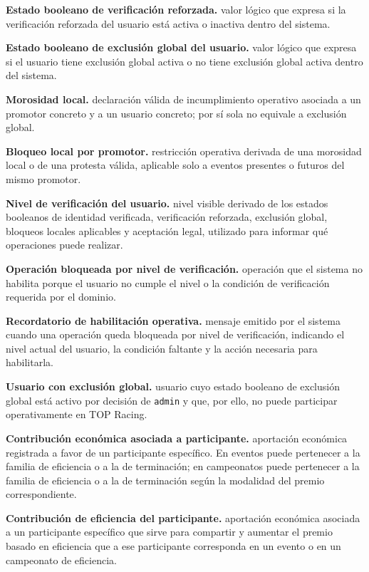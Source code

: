 \documentclass[10pt,letterpaper]{article}
\begin{document}
\noindent\textbf{Estado booleano de verificación reforzada.} valor lógico que expresa si la verificación reforzada del usuario está activa o inactiva dentro del sistema.\par
\noindent\textbf{Estado booleano de exclusión global del usuario.} valor lógico que expresa si el usuario tiene exclusión global activa o no tiene exclusión global activa dentro del sistema.\par
\noindent\textbf{Morosidad local.} declaración válida de incumplimiento operativo asociada a un promotor concreto y a un usuario concreto; por sí sola no equivale a exclusión global.\par
\noindent\textbf{Bloqueo local por promotor.} restricción operativa derivada de una morosidad local o de una protesta válida, aplicable solo a eventos presentes o futuros del mismo promotor.\par
\noindent\textbf{Nivel de verificación del usuario.} nivel visible derivado de los estados booleanos de identidad verificada, verificación reforzada, exclusión global, bloqueos locales aplicables y aceptación legal, utilizado para informar qué operaciones puede realizar.\par
\noindent\textbf{Operación bloqueada por nivel de verificación.} operación que el sistema no habilita porque el usuario no cumple el nivel o la condición de verificación requerida por el dominio.\par
\noindent\textbf{Recordatorio de habilitación operativa.} mensaje emitido por el sistema cuando una operación queda bloqueada por nivel de verificación, indicando el nivel actual del usuario, la condición faltante y la acción necesaria para habilitarla.\par
\noindent\textbf{Usuario con exclusión global.} usuario cuyo estado booleano de exclusión global está activo por decisión de \texttt{admin} y que, por ello, no puede participar operativamente en TOP Racing.\par
\noindent\textbf{Contribución económica asociada a participante.} aportación económica registrada a favor de un participante específico. En eventos puede pertenecer a la familia de eficiencia o a la de terminación; en campeonatos puede pertenecer a la familia de eficiencia o a la de terminación según la modalidad del premio correspondiente.\par
\noindent\textbf{Contribución de eficiencia del participante.} aportación económica asociada a un participante específico que sirve para compartir y aumentar el premio basado en eficiencia que a ese participante corresponda en un evento o en un campeonato de eficiencia.\par
\end{document}
